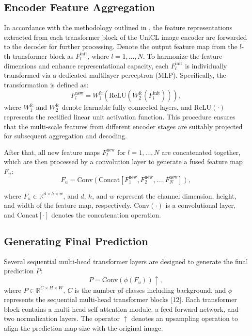 \subsection{Encoder Feature Aggregation}
\label{subsec:en_feature_agg}
In accordance with the methodology outlined in \cite{wsss_frozen_clip}, the feature representations extracted from each transformer block of the UniCL image encoder \cite{vl_unicl} are forwarded to the decoder for further processing. Denote the output feature map from the $l$-th transformer block as \( F_l^{\text{init}} \), where \( l = 1, \dots, N \). To harmonize the feature dimensions and enhance representational capacity, each \( F_l^{\text{init}} \) is individually transformed via a dedicated multilayer perceptron (MLP). Specifically, the transformation is defined as:
\begin{equation}
    F_l^{\text{new}} = W_{1}^{\text{fc}} \left( \text{ReLU} \left( W_{2}^{\text{fc}}(F_l^{\text{init}}) \right) \right),
\end{equation}
where \( W_{1}^{\text{fc}} \) and \( W_{2}^{\text{fc}} \) denote learnable fully connected layers, and \(\text{ReLU}(\cdot)\) represents the rectified linear unit activation function. This procedure ensures that the multi-scale features from different encoder stages are suitably projected for subsequent aggregation and decoding.


After that, all new feature maps \( F_l^{\text{new}} \) for \( l = 1, \dots, N \) are concatenated together, which are then processed by a convolution layer to generate a fused feature map \( F_u \):
\begin{equation}
    F_u = \text{Conv}\left( \text{Concat}\left[ F_1^{\text{new}}, F_2^{\text{new}}, \dots, F_N^{\text{new}} \right] \right),
    \tag{2}
\end{equation}

where \( F_u \in \mathbb{R}^{d \times h \times w} \), and \( d \), \( h \), and \( w \) represent the channel dimension, height, and width of the feature map, respectively. \(\text{Conv}(\cdot)\) is a convolutional layer, and \(\text{Concat}[\cdot]\) denotes the concatenation operation.


\subsection{Generating Final Prediction}
\label{subsec:decoder_final_pred}

Several sequential multi-head transformer layers are designed to generate the final prediction \( P \):
\begin{equation}
    \label{eq:prediction}
    P = \text{Conv}(\phi(F_u)) \uparrow,
\end{equation}
where \( P \in \mathbb{R}^{C \times H \times W} \), \( C \) is the number of classes including background, and \(\phi\) represents the sequential multi-head transformer blocks [12]. Each transformer block contains a multi-head self-attention module, a feed-forward network, and two normalization layers. The operator \(\uparrow\) denotes an upsampling operation to align the prediction map size with the original image.



